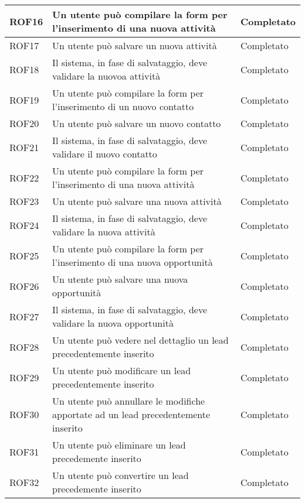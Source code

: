 \begin{longtable}[H]{|p{3cm}|p{8cm}|p{3cm}|}
	\hline
	\rule[-3mm]{0mm}{0.8cm}
	ROF16&Un utente può compilare la form per l'inserimento di una nuova attività  & Completato\\
	\hline
	\rule[-3mm]{0mm}{0.8cm}
	ROF17&Un utente può salvare un nuova attività&Completato\\
	\hline
	\rule[-3mm]{0mm}{0.8cm}
	ROF18&Il sistema, in fase di salvataggio, deve validare la nuovoa attività&Completato \\
	\hline
	\rule[-3mm]{0mm}{0.8cm}
	ROF19&Un utente può compilare la form per l'inserimento di un nuovo contatto&Completato\\
	\hline
	\rule[-3mm]{0mm}{0.8cm}
	ROF20&Un utente può salvare un nuovo contatto&Completato\\
	\hline
	\rule[-3mm]{0mm}{0.8cm}
	ROF21&Il sistema, in fase di salvataggio, deve validare il nuovo contatto&Completato \\
	\hline
	\rule[-3mm]{0mm}{0.8cm}
	ROF22&Un utente può compilare la form per l'inserimento di una nuova attività  &Completato\\
	\hline
	\rule[-3mm]{0mm}{0.8cm}
	ROF23&Un utente può salvare una nuova attività&Completato\\
	\hline
	\rule[-3mm]{0mm}{0.8cm}
	ROF24&Il sistema, in fase di salvataggio, deve validare la nuova attività&Completato \\
	\hline
	\rule[-3mm]{0mm}{0.8cm}
	ROF25&Un utente può compilare la form per l'inserimento di una nuova opportunità  &Completato\\
	\hline
	\rule[-3mm]{0mm}{0.8cm}
	ROF26&Un utente può salvare una nuova opportunità&Completato\\
	\hline
	\rule[-3mm]{0mm}{0.8cm}
	ROF27&Il sistema, in fase di salvataggio, deve validare la nuova opportunità&Completato \\
	\hline
	\rule[-3mm]{0mm}{0.8cm}
	ROF28&Un utente può vedere nel dettaglio un lead precedentemente inserito&Completato\\
	\hline
	\rule[-3mm]{0mm}{0.8cm}
	ROF29&Un utente può modificare un lead precedentemente inserito&Completato\\
	\hline
	\rule[-3mm]{0mm}{0.8cm}
	ROF30&Un utente può annullare le modifiche apportate ad un lead precedentemente inserito&Completato\\
	\hline
	\rule[-3mm]{0mm}{0.8cm}
	ROF31&Un utente può eliminare un lead precedemente inserito&Completato\\
	\hline
	\rule[-3mm]{0mm}{0.8cm}
	ROF32&Un utente può convertire un lead precedemente inserito&Completato\\

\end{longtable}
